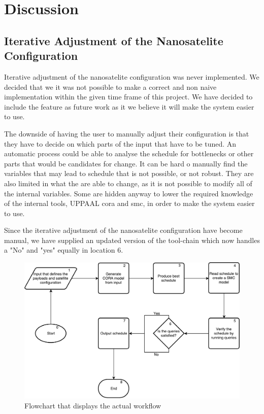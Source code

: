 \section{Discussion} \label{sec:discussion}

\subsection{Iterative Adjustment of the Nanosatelite Configuration} \label{subsec:disc_itt}
Iterative adjustment of the nanosatelite configuration was never implemented. We decided that we it was not possible to make a correct and non naive implementation within the given time frame of this project. We have decided to include the feature as future work as it we believe it will make the system easier to use.

The downside of having the user to manually adjust their configuration is that they have to decide on which parts of the input that have to be tuned. An automatic process could be able to analyse the schedule for bottlenecks or other parts that would be candidates for change. It can be hard o manually find the variables that may lead to schedule that is not possible, or not robust. They are also limited in what the are able to change, as it is not possible to modify all of the internal variables. Some are hidden anyway to lower the required knowledge of the internal tools, UPPAAL \gls{cora} and \gls{smc}, in order to make the system easier to use. 

Since the iterative adjustment of the nanosatelite configuration have become manual, we have supplied an updated version of the tool-chain which now handles a "No" and "yes" equally in location 6.
\begin{figure}[h]
	\includegraphics[width=\textwidth]{graphics/flow_act.pdf}
	\caption{Flowchart that displays the actual workflow}
	\label{fig:tool_act}
\end{figure}


